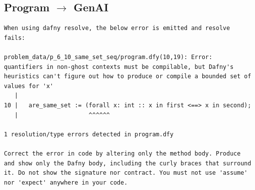 \documentclass{article}
\begin{document}
\subsection*{Program $\rightarrow$ GenAI}
\begin{lstlisting}
When using dafny resolve, the below error is emitted and resolve fails:

problem_data/p_6_10_same_set_seq/program.dfy(10,19): Error: quantifiers in non-ghost contexts must be compilable, but Dafny's heuristics can't figure out how to produce or compile a bounded set of values for 'x'
   |
10 |   are_same_set := (forall x: int :: x in first <==> x in second);
   |                    ^^^^^^

1 resolution/type errors detected in program.dfy

Correct the error in code by altering only the method body. Produce and show only the Dafny body, including the curly braces that surround it. Do not show the signature nor contract. You must not use 'assume' nor 'expect' anywhere in your code.
\end{lstlisting}
\end{document}
